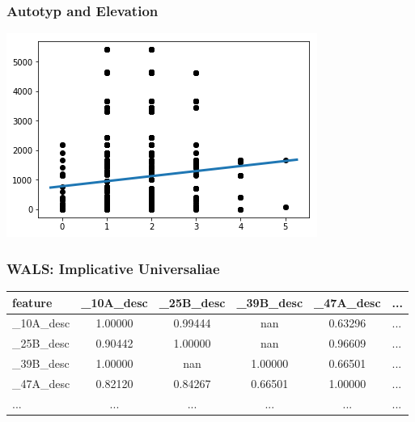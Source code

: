 \documentclass{beamer}
\begin{document}
\begin{frame}
 \frametitle{Autotyp and Elevation}
 \includegraphics[width=\textwidth]{images/AutotypRegr.png}
\end{frame}

\begin{frame}
\frametitle{WALS: Implicative Universaliae}

\begin{adjustbox}{max width=\textwidth}
\begin{tabular}{|l|cccc|l|}
\hline
feature & \_10A\_desc & \_25B\_desc & \_39B\_desc & \_47A\_desc & ... \\
\hline
\_10A\_desc &   1.00000 &   0.99444 &       nan &   0.63296 &   ... \\
\_25B\_desc &   0.90442 &   1.00000 &       nan &   0.96609 &   ... \\
\_39B\_desc &   1.00000 &       nan &   1.00000 &   0.66501 &   ... \\
\_47A\_desc &   0.82120 &   0.84267 &   0.66501 &   1.00000 &   ... \\
\hline
... &   ... &   ... &       ... &   ... &   ... \\
\hline
\end{tabular}
\end{adjustbox}
\end{frame}
\end{document}
